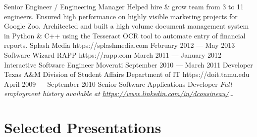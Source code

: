\documentclass{resume}
\begin{document}
    {Senior Engineer / Engineering Manager}
    {Helped hire \& grow team from 3 to 11 engineers. Ensured high performance on highly visible marketing projects for Google Zoo. Architected and built a high volume document management system in Python \& C++ using the Tesseract OCR tool to automate entry of financial reports.}
\employer
    {Splash Media}
    {https://splashmedia.com}
    {February 2012 --- May 2013}
    {Software Wizard}
    {}
\employer
    {RAPP}
    {https://rapp.com}
    {March 2011 --- January 2012}
    {Interactive Software Engineer}
    {}
\employer
    {Moverati}
    {}
    {September 2010 --- March 2011}
    {Developer}
    {}
\employer
    {Texas A\&M Division of Student Affairs Department of IT}
    {https://doit.tamu.edu}
    {April 2009 --- September 2010}
    {Senior Software Applications Developer}
    {}
\emph{Full employment history available at \href{https://www.linkedin.com/in/dcousineau/}{https://www.linkedin.com/in/dcousineau/}\ldots}


\section{Selected Presentations}
\end{document}
